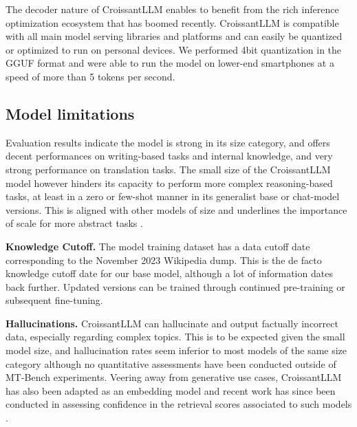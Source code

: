 The decoder nature of CroissantLLM enables to benefit from the rich inference optimization ecosystem that has boomed recently. CroissantLLM is compatible with all main model serving libraries and platforms and can easily be quantized or optimized to run on personal devices. We performed 4bit quantization in the GGUF format and were able to run the model on lower-end smartphones at a speed of more than 5 tokens per second.

\subsection{Model limitations}

Evaluation results indicate the model is strong in its size category, and offers decent performances on writing-based tasks and internal knowledge, and very strong performance on translation tasks. The small size of the CroissantLLM model however hinders its capacity to perform more complex reasoning-based tasks, at least in a zero or few-shot manner in its generalist base or chat-model versions. This is aligned with other models of size and underlines the importance of scale for more abstract tasks .

\textbf{Knowledge Cutoff.} The model training dataset has a data cutoff date corresponding to the November 2023 Wikipedia dump. This is the de facto knowledge cutoff date for our base model, although a lot of information dates back further. Updated versions can be trained through continued pre-training or subsequent fine-tuning.


\textbf{Hallucinations.} CroissantLLM can hallucinate  and output factually incorrect data, especially regarding complex topics. This is to be expected given the small model size, and hallucination rates seem inferior to most models of the same size category although no quantitative assessments have been conducted outside of MT-Bench experiments. Veering away from generative use cases, CroissantLLM has also been adapted as an embedding model  and recent work has since been conducted in assessing confidence in the retrieval scores associated to such models .



